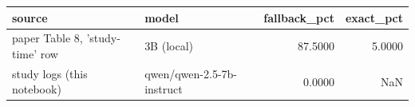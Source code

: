 \begin{tabular}{llrr}
\toprule
                         source &                     model &  fallback\_pct &  exact\_pct \\
\midrule
paper Table 8, 'study-time' row &                3B (local) &       87.5000 &     5.0000 \\
     study logs (this notebook) & qwen/qwen-2.5-7b-instruct &        0.0000 &        NaN \\
\bottomrule
\end{tabular}
